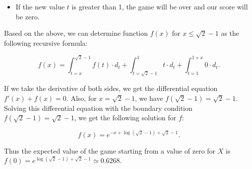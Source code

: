 \begin{solution}
\begin{itemize}
\item If the new value $t$ is greater than 1, the game will be over and our score will be zero.
\end{itemize}

Based on the above, we can determine function $f(x)$ for  $x \leq \sqrt{2}-1$ as the following recursive formula:

$$f(x) = \int_{t=x}^{\sqrt{2}-1} f(t)\cdot d_t + \int_{t=\sqrt{2}-1}^1 t\cdot d_t + \int_{t=1}^{1+x} 0\cdot d_t.$$

If we take the derivative of both sides, we get the differential equation $f'(x)+f(x)=0$. Also, for $x=\sqrt{2}-1$, we have $f(\sqrt{2}-1)=\sqrt{2}-1$. Solving this differential equation with the boundary condition $f(\sqrt{2}-1) = \sqrt{2}-1$, we get the following solution for $f$:

$$f(x) = e^{-x+\log(\sqrt{2}-1)+\sqrt{2}-1}.$$

Thus the expected value of the game starting from a value of zero for $X$ is $f(0) = e^{\log(\sqrt{2}-1)+\sqrt{2}-1}  \simeq 0.6268$.


\end{solution}
